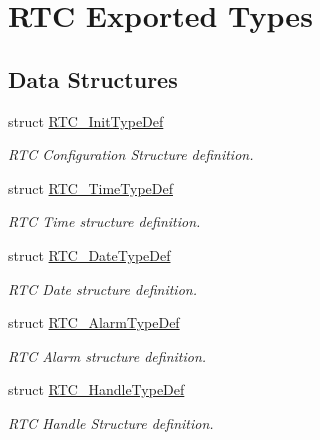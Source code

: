 \hypertarget{group___r_t_c___exported___types}{}\section{R\+TC Exported Types}
\label{group___r_t_c___exported___types}
\subsection*{Data Structures}
\begin{DoxyCompactItemize}
\item 
struct \hyperlink{struct_r_t_c___init_type_def}{R\+T\+C\+\_\+\+Init\+Type\+Def}
\begin{DoxyCompactList}\small\item\em R\+TC Configuration Structure definition. \end{DoxyCompactList}\item 
struct \hyperlink{struct_r_t_c___time_type_def}{R\+T\+C\+\_\+\+Time\+Type\+Def}
\begin{DoxyCompactList}\small\item\em R\+TC Time structure definition. \end{DoxyCompactList}\item 
struct \hyperlink{struct_r_t_c___date_type_def}{R\+T\+C\+\_\+\+Date\+Type\+Def}
\begin{DoxyCompactList}\small\item\em R\+TC Date structure definition. \end{DoxyCompactList}\item 
struct \hyperlink{struct_r_t_c___alarm_type_def}{R\+T\+C\+\_\+\+Alarm\+Type\+Def}
\begin{DoxyCompactList}\small\item\em R\+TC Alarm structure definition. \end{DoxyCompactList}\item 
struct \hyperlink{struct_r_t_c___handle_type_def}{R\+T\+C\+\_\+\+Handle\+Type\+Def}
\begin{DoxyCompactList}\small\item\em R\+TC Handle Structure definition. \end{DoxyCompactList}\end{DoxyCompactItemize}
